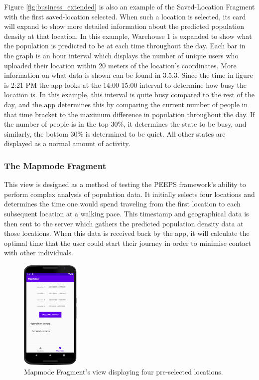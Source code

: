 Figure \ref{fig:business_extended} is also an example of the Saved-Location Fragment with the first saved-location selected. When such a location is selected, its card will expand to show more detailed information about the predicted population density at that location. In this example, Warehouse 1 is expanded to show what the population is predicted to be at each time throughout the day. Each bar in the graph is an hour interval which displays the number of unique users who uploaded their location within 20 meters of the location’s coordinates. More information on what data is shown can be found in 3.5.3.  
Since the time in figure is 2:21 PM the app looks at the 14:00-15:00 interval to determine how busy the location is. In this example, this interval is quite busy compared to the rest of the day, and the app determines this by comparing the current number of people in that time bracket to the maximum difference in population throughout the day. If the number of people is in the top 30\%, it determines the state to be busy, and similarly, the bottom 30\% is determined to be quiet. All other states are displayed as a normal amount of activity. 

\subsubsection{The Mapmode Fragment}

This view is designed as a method of testing the PEEPS framework’s ability to perform complex analysis of population data. It initially selects four locations and determines the time one would spend traveling from the first location to each subsequent location at a walking pace. This timestamp and geographical data is then sent to the server which gathers the predicted population density data at those locations. When this data is received back by the app, it will calculate the optimal time that the user could start their journey in order to minimise contact with other individuals.

\begin{figure}[ht]
    \centering
    \includegraphics[width=0.25\textwidth]{figures/MapmodeDesign.png}
    \caption{Mapmode Fragment's view displaying four pre-selected locations.}
    \label{fig:mapmode_design}
\end{figure}

